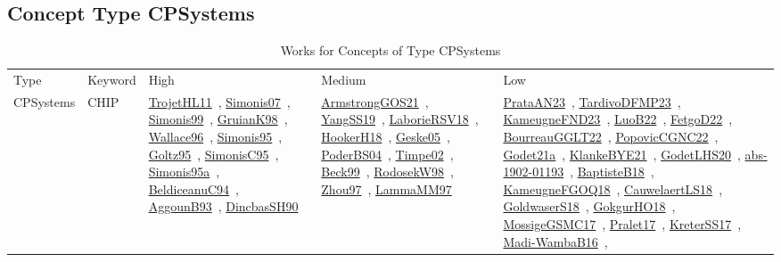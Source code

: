 \clearpage
\subsection{Concept Type CPSystems}
\label{sec:CPSystems}
{\scriptsize
\begin{longtable}{lp{3cm}>{\raggedright\arraybackslash}p{6cm}>{\raggedright\arraybackslash}p{6cm}>{\raggedright\arraybackslash}p{8cm}}
\rowcolor{white}\caption{Works for Concepts of Type CPSystems}\\ \toprule
\rowcolor{white}Type & Keyword & High & Medium & Low\\ \midrule\endhead
\bottomrule
\endfoot
CPSystems & CHIP & \href{works/TrojetHL11.pdf}{TrojetHL11}~\cite{TrojetHL11}, \href{works/Simonis07.pdf}{Simonis07}~\cite{Simonis07}, \href{works/Simonis99.pdf}{Simonis99}~\cite{Simonis99}, \href{works/GruianK98.pdf}{GruianK98}~\cite{GruianK98}, \href{works/Wallace96.pdf}{Wallace96}~\cite{Wallace96}, \href{works/Simonis95.pdf}{Simonis95}~\cite{Simonis95}, \href{works/Goltz95.pdf}{Goltz95}~\cite{Goltz95}, \href{works/SimonisC95.pdf}{SimonisC95}~\cite{SimonisC95}, \href{works/Simonis95a.pdf}{Simonis95a}~\cite{Simonis95a}, \href{works/BeldiceanuC94.pdf}{BeldiceanuC94}~\cite{BeldiceanuC94}, \href{works/AggounB93.pdf}{AggounB93}~\cite{AggounB93}, \href{works/DincbasSH90.pdf}{DincbasSH90}~\cite{DincbasSH90} & \href{works/ArmstrongGOS21.pdf}{ArmstrongGOS21}~\cite{ArmstrongGOS21}, \href{works/YangSS19.pdf}{YangSS19}~\cite{YangSS19}, \href{works/LaborieRSV18.pdf}{LaborieRSV18}~\cite{LaborieRSV18}, \href{works/HookerH18.pdf}{HookerH18}~\cite{HookerH18}, \href{works/Geske05.pdf}{Geske05}~\cite{Geske05}, \href{works/PoderBS04.pdf}{PoderBS04}~\cite{PoderBS04}, \href{works/Timpe02.pdf}{Timpe02}~\cite{Timpe02}, \href{works/Beck99.pdf}{Beck99}~\cite{Beck99}, \href{works/RodosekW98.pdf}{RodosekW98}~\cite{RodosekW98}, \href{works/Zhou97.pdf}{Zhou97}~\cite{Zhou97}, \href{works/LammaMM97.pdf}{LammaMM97}~\cite{LammaMM97} & \href{works/PrataAN23.pdf}{PrataAN23}~\cite{PrataAN23}, \href{works/TardivoDFMP23.pdf}{TardivoDFMP23}~\cite{TardivoDFMP23}, \href{works/KameugneFND23.pdf}{KameugneFND23}~\cite{KameugneFND23}, \href{works/LuoB22.pdf}{LuoB22}~\cite{LuoB22}, \href{works/FetgoD22.pdf}{FetgoD22}~\cite{FetgoD22}, \href{works/BourreauGGLT22.pdf}{BourreauGGLT22}~\cite{BourreauGGLT22}, \href{works/PopovicCGNC22.pdf}{PopovicCGNC22}~\cite{PopovicCGNC22}, \href{works/Godet21a.pdf}{Godet21a}~\cite{Godet21a}, \href{works/KlankeBYE21.pdf}{KlankeBYE21}~\cite{KlankeBYE21}, \href{works/GodetLHS20.pdf}{GodetLHS20}~\cite{GodetLHS20}, \href{works/abs-1902-01193.pdf}{abs-1902-01193}~\cite{abs-1902-01193}, \href{works/BaptisteB18.pdf}{BaptisteB18}~\cite{BaptisteB18}, \href{works/KameugneFGOQ18.pdf}{KameugneFGOQ18}~\cite{KameugneFGOQ18}, \href{works/CauwelaertLS18.pdf}{CauwelaertLS18}~\cite{CauwelaertLS18}, \href{works/GoldwaserS18.pdf}{GoldwaserS18}~\cite{GoldwaserS18}, \href{works/GokgurHO18.pdf}{GokgurHO18}~\cite{GokgurHO18}, \href{works/MossigeGSMC17.pdf}{MossigeGSMC17}~\cite{MossigeGSMC17}, \href{works/Pralet17.pdf}{Pralet17}~\cite{Pralet17}, \href{works/KreterSS17.pdf}{KreterSS17}~\cite{KreterSS17}, \href{works/Madi-WambaB16.pdf}{Madi-WambaB16}~\cite{Madi-WambaB16}, 
\end{longtable}}
